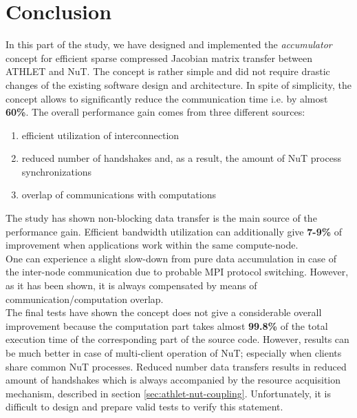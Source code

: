 \section{Conclusion}
\label{sec:accumulator-conclusions}


In this part of the study, we have designed and implemented the \textit{accumulator} concept for efficient sparse compressed Jacobian matrix transfer between ATHLET and NuT. The concept is rather simple and did not require drastic changes of the existing software design and architecture. In spite of simplicity, the concept allows to significantly reduce the communication time i.e. by almost \textbf{60\%}. The overall performance gain comes from three different sources: 

\begin{enumerate}
	\item efficient utilization of interconnection
	\item reduced number of handshakes and, as a result, the amount of NuT process synchronizations
	\item overlap of communications with computations
\end{enumerate}

The study has shown non-blocking data transfer is the main source of the performance gain. Efficient bandwidth utilization can additionally give \textbf{7-9\%} of improvement when applications work within the same compute-node.\\


One can experience a slight slow-down from pure data accumulation in case of the inter-node communication due to probable MPI protocol switching. However, as it has been shown, it is always compensated by means of communication/computation overlap.\\


The final tests have shown the concept does not give a considerable overall improvement because the computation part takes almost \textbf{99.8\%} of the total execution time of the corresponding part of the source code. However, results can be much better in case of multi-client operation of NuT; especially when clients share common NuT processes. Reduced number data transfers results in reduced amount of handshakes which is always accompanied by the resource acquisition mechanism, described in section \ref{sec:athlet-nut-coupling}. Unfortunately, it is difficult to design and prepare valid tests to verify this statement. \\


